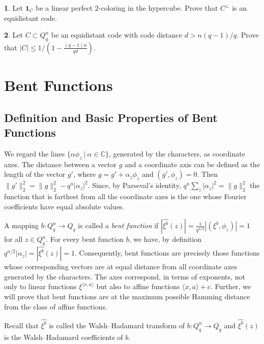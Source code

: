 \documentclass[11pt]{article}
\theoremstyle{definition}
\newtheorem{exercise}{\quad}
\begin{document}
{{{\begin{exercise}
Let ${\mathbf 1}_{C}$ be a linear perfect $2$-coloring in the hypercube. Prove that $C^\perp$ is an equidistant code.
\end{exercise}

\begin{exercise}
Let $C\subset Q^n_q$ be an equidistant code with code distance $d>n(q-1)/q$. Prove that $|C|\leq 1/(1-\frac{(q-1)n}{qd})$.
\end{exercise}


\section{Bent Functions}

\subsection{Definition and Basic Properties of Bent Functions}


We  regard the lines
$\{\alpha\phi_z \ |\ \alpha\in \mathbb{C}\}$, generated by the characters,
as coordinate axes. The distance between a vector $g$ and a coordinate axis
can be defined as the length of the vector $g'$, where $g=g'+\alpha_z\phi_z$ and
$(g',\phi_z)=0$. Then $\|g'\|^2_2=\|g\|^2_2-q^n|\alpha_z|^2$.
Since, by Parseval's identity, $q^n\sum_z|\alpha_z|^2=\|g\|^2_2$ 
the function that is farthest from all the coordinate axes is the one whose
Fourier coefficients have equal absolute values.

A mapping $b:Q^n_q\rightarrow Q_q$ is called a {\sl bent function}
if $|\widehat{\xi^b}(z)|=\frac{1}{q^{n/2}}|(\xi^b,\phi_z)|= 1$ for
all $z\in Q^n_q$.
For every bent function $b$, we  have, by definition  
$q^{n/2}|\alpha_z|=|\widehat{\xi^b}(z)|=1$.
Consequently, bent functions are precisely those functions whose corresponding vectors are at equal distance from all coordinate axes generated by the characters.
The axes correspond, in terms of exponents, not only to linear functions $\xi^{\langle
x,a\rangle}$  but also to affine functions $\langle x,a\rangle+c$. Further,  we will prove that bent functions are 
at the maximum possible Hamming distance from the class of affine functions.

Recall that $\widehat{\xi^b}$ is called the Walsh--Hadamard transform of $b:Q^n_q\rightarrow Q_q$ and 
 $\widehat{\xi^b}(z)$ is the Walsh--Hadamard coefficients of $b$.
 
}}}
\end{document}
